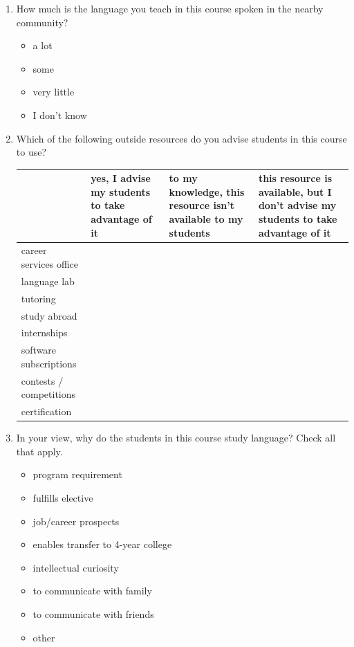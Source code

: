 \documentclass[letterpaper,10pt]{article}
\begin{document}
\begin{enumerate}[resume]

\item How much is the language you teach in this course spoken in the nearby community?
\vspace{-0.1in}\begin{multicols}{2}
\begin{itemize}
	\item a lot
	\item some
	\item very little
	\item I don’t know
\end{itemize}
\end{multicols}

\item Which of the following outside resources do you advise students in this course to use?\\[0.05in]

\renewcommand{\arraystretch}{1.5}
\begin{tabular}{|p{1.4in}|p{1.3in}|p{1.5in}|p{1.5in}|}
\hline
 & yes, I advise my students to take advantage of it & to my knowledge, this resource isn’t available to my students & this resource is available, but I don’t advise my students to take advantage of it\\
\hline
career services office & & &\\
\hline
language lab & & &\\
\hline
tutoring & & &\\
\hline
study abroad & & &\\
\hline
internships & & &\\
\hline
software subscriptions & & &\\
\hline
contests / competitions & & &\\
\hline
certification & & &\\
\hline
\end{tabular}




\item In your view, why do the students in this course study language? Check all that apply.
\vspace{-0.1in}\begin{multicols}{2}
\begin{itemize}
	\item program requirement
	\item fulfills elective
	\item job/career prospects
	\item enables transfer to 4-year college
	\item intellectual curiosity
	\item to communicate with family
	\item to communicate with friends
	\item other \underline{\hspace{2in}}
\end{itemize}
\end{multicols}


\end{enumerate}
\end{document}
